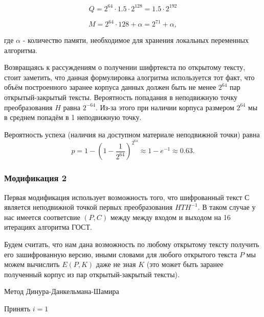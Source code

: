 \documentclass[a4paper,12pt]{article}
\theoremstyle{definition}
\begin{document}
	\[ Q = 2^{64} \cdot 1.5 \cdot 2^{128} = 1.5 \cdot 2^{192} \]
	
	\[ M = 2^{64} \cdot 128 + \alpha = 2^{71} + \alpha,  \]
	
	где $\alpha$ - количество памяти, необходимое для хранения локальных переменных алгоритма.
	
	Возвращаясь к рассуждениям о получении шифртекста по открытому тексту, стоит заметить, что данная формулировка алогритма используется тот факт, что объём построенного заранее корпуса данных должен быть не менее $2^{64}$ пар открытый-закрытый тексты. Вероятность попадания в неподвижную точку преобразования $H$ равна $2^{-64}$. Из-за этого при наличии корпуса размером $2^{64}$ мы в среднем попадём в 1 неподвижную точку.
	
	Вероятность успеха (наличия на доступном материале неподвижной точки) равна	\[ p=1-(1-\frac{1}{2^{64}})^{2^{64}} \approx 1 - e^{-1} \approx 0.63. \]
	
	
	\subsubsection*{Модификация 2}
	
	Первая модификация использует возможность того, что шифрованный текст $С$ является неподвижной точкой первых преобразования $H T H^{-1}$. В таком случае у нас имеется соответсвие $(P, C)$ между между входом и выходом на 16 итерациях алгоритма ГОСТ.
	
	Будем считать, что нам дана возможность по любому открытому тексту получить его зашифрованную версию, иными словами для любого открытого текста $P$ мы можем вычислить $E(P, K)$ даже не зная $K$ (это может быть заранее полученный корпус из пар открытый-закрытый тексты).
	
	\begin{algorithm}[H]
		
		\caption{Метод Динура-Данкельмана-Шамира}
		\label{alg:DDS:first}
		\SetAlgoNoEnd 
		
		
		
		Принять $i=1$
		
	\end{algorithm}
\end{document}
